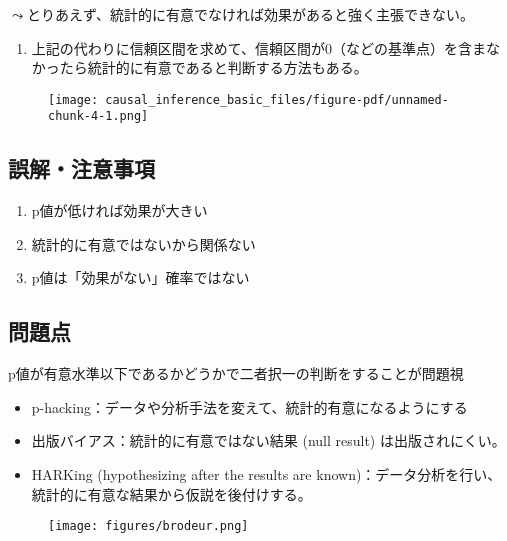\documentclass[
  xelatex,
  ja=standard]{bxjsarticle}
\providecommand{\tightlist}{%
  \setlength{\itemsep}{0pt}\setlength{\parskip}{0pt}}\usepackage{longtable,booktabs,array}
\begin{document}
\(\leadsto\)とりあえず、統計的に有意でなければ効果があると強く主張できない。

\begin{enumerate}
\def\labelenumi{\arabic{enumi}.}
\tightlist
\item
  上記の代わりに信頼区間を求めて、信頼区間が0（などの基準点）を含まなかったら統計的に有意であると判断する方法もある。
\end{enumerate}

\begin{figure}[htpb]

{\centering \texttt{[image: causal\_inference\_basic\_files/figure-pdf/unnamed-chunk-4-1.png]}

}

\end{figure}

\hypertarget{ux8aa4ux89e3ux6ce8ux610fux4e8bux9805}{%
\subsection{誤解・注意事項}\label{ux8aa4ux89e3ux6ce8ux610fux4e8bux9805}}

\begin{enumerate}
\def\labelenumi{\arabic{enumi}.}
\tightlist
\item
  p値が低ければ効果が大きい
\item
  統計的に有意ではないから関係ない
\item
  p値は「効果がない」確率ではない
\end{enumerate}

\hypertarget{ux554fux984cux70b9}{%
\subsection{問題点}\label{ux554fux984cux70b9}}

p値が有意水準以下であるかどうかで二者択一の判断をすることが問題視

\begin{itemize}
\tightlist
\item
  p-hacking：データや分析手法を変えて、統計的有意になるようにする
\item
  出版バイアス：統計的に有意ではない結果 (null result)
  は出版されにくい。
\item
  HARKing (hypothesizing after the results are
  known)：データ分析を行い、統計的に有意な結果から仮説を後付けする。
\end{itemize}

\begin{figure}[htpb]

{\centering \texttt{[image: figures/brodeur.png]}

}

\caption{\citet{brodeur2020}}

\end{figure}
\end{document}
